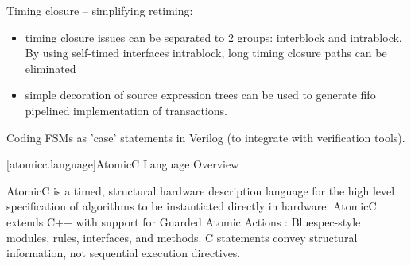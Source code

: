 Timing closure -- simplifying retiming:
\begin{itemize}
\item timing closure issues
can be separated to 2 groups: interblock and intrablock.
By using self-timed interfaces intrablock, long timing closure paths can be eliminated
\item simple decoration of source expression trees can be used to generate
fifo pipelined implementation of transactions.
\end{itemize}

Coding FSMs as 'case' statements in Verilog (to integrate with verification tools).

\eject

[atomicc.language]{AtomicC Language Overview}

AtomicC is a timed, structural hardware description language for
the high level specification of algorithms to be instantiated
directly in hardware.
AtomicC extends C++
with support for Guarded Atomic Actions
\cite{Hoe:Thesis,HoeArvind:TRSSynthesis2,Dave2007}:
Bluespec-style\cite{Bluespec:www}
modules, rules, interfaces, and methods.
C statements convey structural information, not sequential execution directives.


